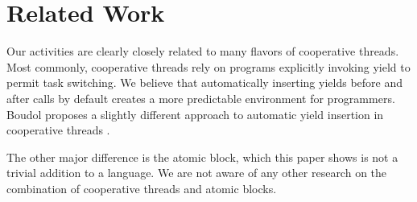 \documentclass[sigplan,10pt,review,anonymous]{acmart}\settopmatter{printfolios=true,printccs=false,printacmref=false}
\begin{document}




\section{Related Work}

Our activities are clearly closely related to many flavors of cooperative threads.
Most commonly, cooperative threads rely on programs explicitly invoking yield to permit task switching.
We believe that automatically inserting yields before and after calls by default creates a more predictable environment for programmers.
Boudol proposes a slightly different approach to automatic yield insertion in cooperative threads \cite{Boudol2007}.

The other major difference is the atomic block, which this paper shows is not a trivial addition to a language.
We are not aware of any other research on the combination of cooperative threads and atomic blocks.
\end{document}
